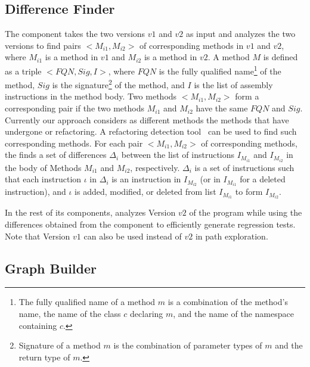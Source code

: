 \subsection{Difference Finder}
The  component takes the two versions $v1$ and $v2$ as input and analyzes the two versions to find pairs $<M_{i1}, M_{i2}>$ of corresponding methods in $v1$ and $v2$, where $M_{i1}$ is a method in $v1$ and $M_{i2}$ is a method in $v2$. A method $M$ is defined as a triple $<FQN, Sig, I>$, where $FQN$ is the fully qualified name\footnote{\scriptsize{The fully qualified name of a method $m$ is a combination of the method's name, the name of the class $c$ declaring $m$, and the name of the namespace containing $c$.}} of the method, $Sig$ is the signature\footnote{\scriptsize{Signature of a method $m$ is the combination of parameter types of $m$ and the return type of $m$.}} of the method, and $I$ is the list of assembly instructions in the method body. Two methods $<M_{i1}, M_{i2}>$ form a  corresponding pair if the two methods $M_{i1}$ and $M_{i2}$ have the same $FQN$ and $Sig$. Currently our approach considers as different methods the methods that have undergone  or  refactoring. A refactoring detection tool~\cite{Dig'06:ECOOP} can be used to find such corresponding methods. For each pair $<M_{i1}, M_{i2}>$ of corresponding methods, the  finds a set of  differences $\Delta_i$ between the list of instructions $I_{M_{i1}}$ and $I_{M_{i2}}$ in the body of Methods $M_{i1}$ and $M_{i2}$, respectively. $\Delta_i$ is a set of instructions such that each instruction $\iota$ in $\Delta_i$ is an instruction in $I_{M_{i2}}$ (or in $I_{M_{i1}}$ for a deleted instruction), and $\iota$ is added, modified, or deleted from list $I_{M_{i1}}$ to form $I_{M_{i2}}$.

In the rest of its components,  analyzes Version $v2$ of the program while using the differences obtained from the  component to efficiently generate regression tests. Note that Version $v1$ can also be used instead of $v2$ in path exploration.

\subsection{Graph Builder}
   
